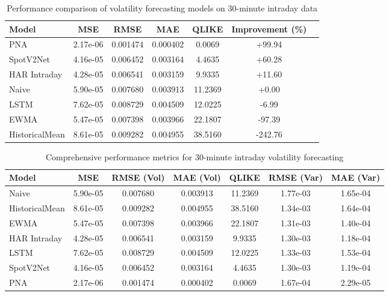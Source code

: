 \documentclass[journal]{IEEEtran}
\begin{document}
\begin{table}[!t]
\centering
\caption{Performance comparison of volatility forecasting models on 30-minute intraday data}
\label{tab:main_results}
\begin{tabular}{@{}lcccccc@{}}
\toprule
Model & MSE & RMSE & MAE & QLIKE & Improvement (\%) \\
\midrule
PNA & 2.17e-06 & 0.001474 & 0.000402 & 0.0069 & +99.94 \\
SpotV2Net & 4.16e-05 & 0.006452 & 0.003164 & 4.4635 & +60.28 \\
HAR Intraday & 4.28e-05 & 0.006541 & 0.003159 & 9.9335 & +11.60 \\
\rowcolor{bestcolor}Naive & 5.90e-05 & 0.007680 & 0.003913 & 11.2369 & +0.00 \\
LSTM & 7.62e-05 & 0.008729 & 0.004509 & 12.0225 & -6.99 \\
EWMA & 5.47e-05 & 0.007398 & 0.003966 & 22.1807 & -97.39 \\
HistoricalMean & 8.61e-05 & 0.009282 & 0.004955 & 38.5160 & -242.76 \\
\bottomrule
\end{tabular}
\end{table}


\begin{table*}[!t]
\centering
\caption{Comprehensive performance metrics for 30-minute intraday volatility forecasting}
\label{tab:comprehensive_results}
\begin{tabular}{@{}lS[table-format=1.2e-1]S[table-format=1.6]S[table-format=1.6]S[table-format=1.4]S[table-format=1.2e-1]S[table-format=1.2e-1]@{}}
\toprule
{Model} & {MSE} & {RMSE (Vol)} & {MAE (Vol)} & {QLIKE} & {RMSE (Var)} & {MAE (Var)} \\
\midrule
{}Naive & 5.90e-05 & 0.007680 & 0.003913 & 11.2369 & 1.77e-03 & 1.65e-04 \\
HistoricalMean & 8.61e-05 & 0.009282 & 0.004955 & 38.5160 & 1.34e-03 & 1.64e-04 \\
EWMA & 5.47e-05 & 0.007398 & 0.003966 & 22.1807 & 1.31e-03 & 1.40e-04 \\
HAR Intraday & 4.28e-05 & 0.006541 & 0.003159 & 9.9335 & 1.30e-03 & 1.18e-04 \\
LSTM & 7.62e-05 & 0.008729 & 0.004509 & 12.0225 & 1.33e-03 & 1.53e-04 \\
SpotV2Net & 4.16e-05 & 0.006452 & 0.003164 & 4.4635 & 1.30e-03 & 1.19e-04 \\
PNA & 2.17e-06 & 0.001474 & 0.000402 & 0.0069 & 1.67e-04 & 2.29e-05 \\
\bottomrule
\end{tabular}
\end{table*}
\end{document}
